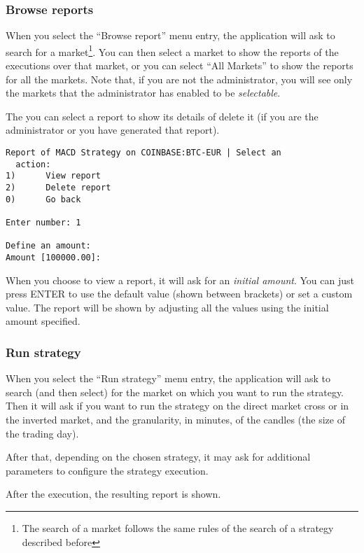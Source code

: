 \subsubsection{Browse reports}

When you select the ``Browse report'' menu entry, the application will ask to
search for a market\footnote{The search of a market follows the same rules of
the search of a strategy described before}. You can then select a market to show
the reports of the executions over that market, or you can select ``All
Markets'' to show the reports for all the markets. Note that, if you are not the
administrator, you will see only the markets that the administrator has enabled
to be \emph{selectable}.

The you can select a report to show its details of delete it (if you are the
administrator or you have generated that report).

\begin{verbatim}
Report of MACD Strategy on COINBASE:BTC-EUR | Select an
  action:
1)      View report
2)      Delete report
0)      Go back

Enter number: 1

Define an amount:
Amount [100000.00]: 
\end{verbatim}

When you choose to view a report, it will ask for an \emph{initial amount}. You
can just press ENTER to use the default value (shown between brackets) or set a
custom value. The report will be shown by adjusting all the values using the
initial amount specified.

\subsubsection{Run strategy}

When you select the ``Run strategy'' menu entry, the application will ask to
search (and then select) for the market on which you want to run the strategy.
Then it will ask if you want to run the strategy on the direct market cross or
in the inverted market, and the granularity, in minutes, of the candles (the
size of the trading day).

After that, depending on the chosen strategy, it may ask for additional
parameters to configure the strategy execution.

After the execution, the resulting report is shown.

